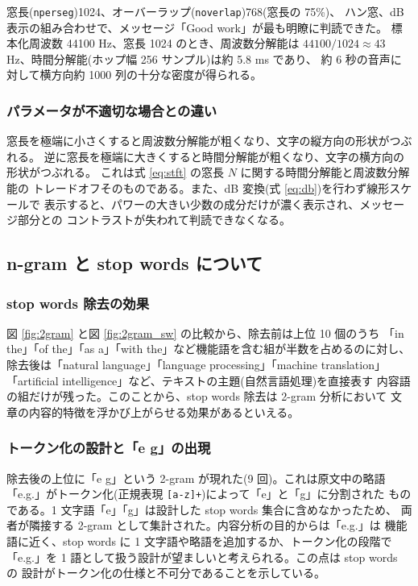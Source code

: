 窓長({\tt nperseg})1024、オーバーラップ({\tt noverlap})768(窓長の 75\%)、
ハン窓、dB 表示の組み合わせで、メッセージ「Good work」が最も明瞭に判読できた。
標本化周波数 44100 Hz、窓長 1024 のとき、周波数分解能は
$44100 / 1024 \approx 43$ Hz、時間分解能(ホップ幅 256 サンプル)は約 5.8 ms であり、
約 6 秒の音声に対して横方向約 1000 列の十分な密度が得られる。

\subsubsection{パラメータが不適切な場合との違い}

窓長を極端に小さくすると周波数分解能が粗くなり、文字の縦方向の形状がつぶれる。
逆に窓長を極端に大きくすると時間分解能が粗くなり、文字の横方向の形状がつぶれる。
これは式 \ref{eq:stft} の窓長 $N$ に関する時間分解能と周波数分解能の
トレードオフそのものである。また、dB 変換(式 \ref{eq:db})を行わず線形スケールで
表示すると、パワーの大きい少数の成分だけが濃く表示され、メッセージ部分との
コントラストが失われて判読できなくなる。

\subsection{n-gram と stop words について}

\subsubsection{stop words 除去の効果}

図 \ref{fig:2gram} と図 \ref{fig:2gram_sw} の比較から、除去前は上位 10 個のうち
「in the」「of the」「as a」「with the」など機能語を含む組が半数を占めるのに対し、
除去後は「natural language」「language processing」「machine translation」
「artificial intelligence」など、テキストの主題(自然言語処理)を直接表す
内容語の組だけが残った。このことから、stop words 除去は 2-gram 分析において
文章の内容的特徴を浮かび上がらせる効果があるといえる。

\subsubsection{トークン化の設計と「e g」の出現}

除去後の上位に「e g」という 2-gram が現れた(9 回)。これは原文中の略語
「e.g.」がトークン化(正規表現 {\tt [a-z]+})によって「e」と「g」に分割された
ものである。1 文字語「e」「g」は設計した stop words 集合に含めなかったため、
両者が隣接する 2-gram として集計された。内容分析の目的からは「e.g.」は
機能語に近く、stop words に 1 文字語や略語を追加するか、トークン化の段階で
「e.g.」を 1 語として扱う設計が望ましいと考えられる。この点は stop words の
設計がトークン化の仕様と不可分であることを示している。

